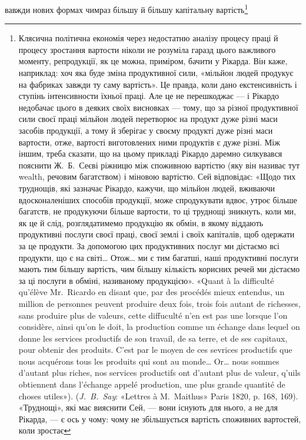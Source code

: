 вавжди нових формах чимраз більшу й більшу капітальну вартість\footnote{
Клясична політична економія через недостатню аналізу процесу
праці й процесу зростання вартости ніколи не розуміла гаразд цього
важливого моменту, репродукції, як це можна, приміром, бачити у Рікарда.
Він каже, наприклад: хоч яка буде зміна продуктивної сили,
«мільйон людей продукує на фабриках завжди ту саму вартість». Це
правда, коли дано екстенсивність і ступінь інтенсивности їхньої праці.
Але це не перешкоджає — і Рікардо недобачає цього в деяких своїх висновках
— тому, що за різної продуктивної сили своєї праці мільйон людей
перетворює на продукт дуже різні маси засобів продукції, а тому й зберігає
у своєму продукті дуже різні маси вартости, отже, вартості виготовлених
ними продуктів є дуже різні. Між іншим, треба сказати, що на цьому
прикладі Рікардо даремно силкувався пояснити Ж.~Б.~Сеєві ріжницю
між споживною вартістю (яку він називає тут wealth, речовим багатством)
і міновою вартістю. Сей відповідає: «Щодо тих труднощів, які
зазначає Рікардо, кажучи, що мільйон людей, вживаючи вдосконаленіших
способів продукції, може спродукувати вдвоє, утроє більше багатств,
не продукуючи більше вартости, то ці труднощі зникнуть, коли ми, як
це й слід, розглядатимемо продукцію як обмін, в якому віддають продуктивні
послуги своєї праці, своєї землі і своїх капіталів, щоб одержати
за це продукти. За допомогою цих продуктивних послуг ми дістаємо всі
продукти, що є на світі\dots{} Отож\dots{} ми є тим багатші, наші продуктивні
послуги мають тим більшу вартість, чим більшу кількість корисних
речей ми дістаємо за ці послуги в обміні, називаному продукцією».
«Quant à la difficulté qu’élève Mr.~Ricardo en disant que, par des procédés
mieux entendus, un million de personnes peuvent produire deux fois,
trois fois autant de richesses, sans produire plus de valeurs, cette diffuculté
n’en est pas une lorsque l’on considère, ainsi qu’on le doit, la production
comme un échange dans lequel on donne les services productifs de son travail,
de sa terre, et de ses capitaux, pour obtenir des produits. C’est par
le moyen de ces sevrices productifs que nous acquérons tous les produits
qui sont au monde\dots{} Or\dots{} nous sommes d’autant plus riches, nos services
productifs ont d’autant plus de valeur, q’uils obtiennent dans l’échange
appelé production, une plus grande quantité de choses utiles»). (\emph{J.~B.~Say}:
«Lettres à M.~Maithus» Paris 1820, p. 168, 169). «Труднощі», які має
вияснити Сей, — вони існують для нього, а не для Рікарда, — є ось у
чому: чому не збільшується вартість споживних вартостей, коли зростає
}
